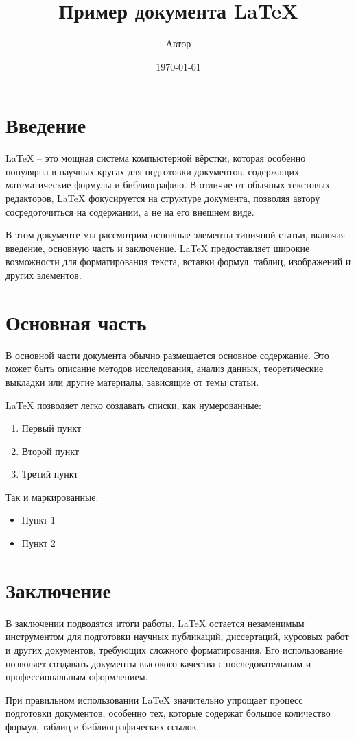 \documentclass{article}
\title{Пример документа LaTeX}
\author{Автор}
\date{\today}
\begin{document}
\maketitle

\section{Введение}
LaTeX -- это мощная система компьютерной вёрстки, которая особенно популярна в научных кругах для подготовки документов, содержащих математические формулы и библиографию. В отличие от обычных текстовых редакторов, LaTeX фокусируется на структуре документа, позволяя автору сосредоточиться на содержании, а не на его внешнем виде.

В этом документе мы рассмотрим основные элементы типичной статьи, включая введение, основную часть и заключение. LaTeX предоставляет широкие возможности для форматирования текста, вставки формул, таблиц, изображений и других элементов.

\section{Основная часть}
В основной части документа обычно размещается основное содержание. Это может быть описание методов исследования, анализ данных, теоретические выкладки или другие материалы, зависящие от темы статьи.

LaTeX позволяет легко создавать списки, как нумерованные:
\begin{enumerate}
\item Первый пункт
\item Второй пункт
\item Третий пункт
\end{enumerate}

Так и маркированные:
\begin{itemize}
\item Пункт 1
\item Пункт 2
\end{itemize}

\section{Заключение}
В заключении подводятся итоги работы. LaTeX остается незаменимым инструментом для подготовки научных публикаций, диссертаций, курсовых работ и других документов, требующих сложного форматирования. Его использование позволяет создавать документы высокого качества с последовательным и профессиональным оформлением.

При правильном использовании LaTeX значительно упрощает процесс подготовки документов, особенно тех, которые содержат большое количество формул, таблиц и библиографических ссылок.
\end{document}
